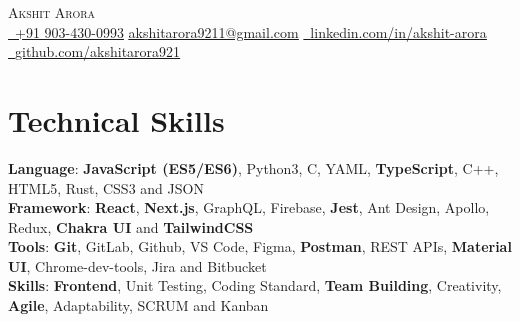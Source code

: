 \documentclass[letterpaper,11pt]{article}
\begin{document}
\begin{center}
    {\Huge \scshape Akshit Arora}  \\ \vspace{1pt}
    \vspace{4pt}
    \small\href{tel:+91 9034300993}{\raisebox{-0.2\height}\ \underline{+91 903-430-0993}} \href{mailto:akshitarora9211@gmail.com}{ \underline{akshitarora9211@gmail.com}} 
    \href{https://www.linkedin.com/in/akshit-arora/}{\raisebox{-0.2\height}\ \underline{linkedin.com/in/akshit-arora}}  ~
    \href{https://github.com/akshitarora921}{\raisebox{-0.2\height}\ \underline{github.com/akshitarora921}}
    \vspace{-8pt}
\end{center}
\section{Technical Skills}
 \begin{itemize}[leftmargin=0.15in, label={}]
    \small{\item{
     \textbf{Language}{: \textbf{JavaScript (ES5/ES6)}, Python3, C, YAML, \textbf{TypeScript}, C++, HTML5,  Rust, CSS3 and JSON} \\
     \textbf{Framework}{:  \textbf{React}, \textbf{Next.js}, GraphQL, Firebase, \textbf{Jest}, Ant Design, Apollo, Redux, \textbf{Chakra UI} and \textbf{TailwindCSS} } \\
     \textbf{Tools}{: \textbf{Git}, GitLab, Github, VS Code, Figma, \textbf{Postman}, REST APIs, \textbf{Material UI}, Chrome-dev-tools, Jira and Bitbucket}\\
     \textbf{Skills}{: \textbf{Frontend}, Unit Testing, Coding Standard, \textbf{Team Building}, Creativity, \textbf{Agile}, Adaptability, SCRUM and Kanban}\\
    }}
 \end{itemize}
 \vspace{-16pt}
\end{document}
